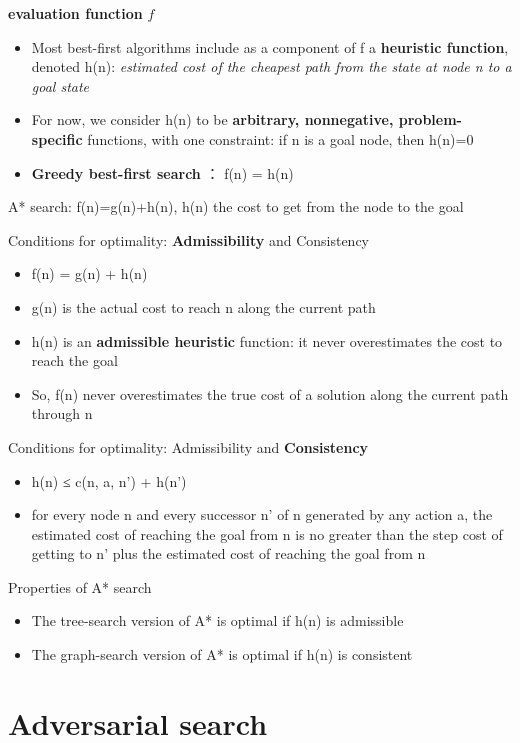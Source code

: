 \documentclass[11pt]{article}
\begin{document}
\textbf{evaluation function} \(f\)
\begin{itemize}
\item Most best-first algorithms include as a component of f a \textbf{heuristic
function}, denoted h(n): \emph{estimated cost of the cheapest path from the state 
at node n to a goal state}
\item For now, we consider h(n) to be \textbf{arbitrary, nonnegative, problem-specific}
functions, with one constraint: if n is a goal node, then h(n)=0
\item \textbf{Greedy best-first search} ： f(n) = h(n)
\end{itemize}


A* search:
f(n)=g(n)+h(n), h(n) the cost to get from the node to the goal


Conditions for optimality: \textbf{Admissibility} and Consistency
\begin{itemize}
\item f(n) = g(n) + h(n)
\item g(n) is the actual cost to reach n along the current path
\item h(n) is an \textbf{admissible heuristic} function: it never overestimates the cost
to reach the goal
\item So, f(n) never overestimates the true cost of a solution along the current
path through n
\end{itemize}


Conditions for optimality: Admissibility and \textbf{Consistency}
\begin{itemize}
\item h(n) ≤ c(n, a, n') + h(n')
\item for every node n and every successor n’ of n generated by any action a,
the estimated cost of reaching the goal from n is no greater than the step
cost of getting to n’ plus the estimated cost of reaching the goal from n
\end{itemize}


Properties of A* search
\begin{itemize}
\item The tree-search version of A* is optimal if h(n) is admissible
\item The graph-search version of A* is optimal if h(n) is consistent
\end{itemize}
\section{Adversarial search}
\label{sec:org0beb57e}
\end{document}
